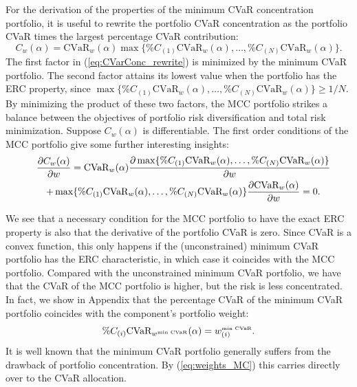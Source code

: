 \documentclass[12pt,a4paper]{article}
\begin{document}
For the derivation of the properties of the minimum CVaR concentration portfolio, it is useful to rewrite the portfolio CVaR concentration as the portfolio CVaR times the largest percentage CVaR contribution:
\begin{equation} C_w(\alpha) = \mbox{CVaR}_w(\alpha) \max \{ \%C_{(1)}\mbox{CVaR}_w(\alpha) , \ldots ,  \%C_{(N)}\mbox{CVaR}_w(\alpha)\}. \label{eq:CVarConc_rewrite}\end{equation}
The first factor in (\ref{eq:CVarConc_rewrite}) is minimized by the minimum CVaR portfolio.  The second factor attains its lowest value when the portfolio has the ERC property, since $\max \{ \%C_{(1)}\mbox{CVaR}_w(\alpha) , \ldots ,  \%C_{(N)}\mbox{CVaR}_w(\alpha)\} \geq 1/N.$  By minimizing the product of these two factors, the MCC portfolio strikes a balance between the objectives of portfolio risk diversification and total risk minimization. Suppose $C_w(\alpha)$ is differentiable. The first order conditions of the MCC portfolio give some further interesting insights:
\begin{eqnarray}
\lefteqn{ \frac{\partial C_w(\alpha)}{\partial w} = \mbox{CVaR}_w(\alpha) \frac{\partial \max\{ \%C_{(1)}\mbox{CVaR}_w(\alpha) , \ldots ,  \%C_{(N)}\mbox{CVaR}_w(\alpha) \}}{\partial w} } && \notag \\
&& +  \max\{ \%C_{(1)}\mbox{CVaR}_w(\alpha) , \ldots ,  \%C_{(N)}\mbox{CVaR}_w(\alpha) \} \frac{\partial \mbox{CVaR}_w(\alpha)}{\partial w} = 0.
\label{eq:FOC_MCC}\end{eqnarray}

We see that a necessary condition for the MCC portfolio to have the exact ERC property is also that the derivative of the portfolio CVaR is zero. Since CVaR is a convex function, this only happens if the (unconstrained) minimum CVaR portfolio has the ERC characteristic, in which case it coincides with the MCC portfolio. Compared with the unconstrained minimum CVaR portfolio, we have that the CVaR of the MCC portfolio is higher, but the risk is less concentrated. In fact, we show in Appendix that the percentage CVaR of the minimum CVaR portfolio coincides with the component's portfolio weight:
\begin{equation} \%C_{(i)} \mbox{CVaR}_{w^{\mbox{\tiny min CVaR}}}(\alpha) = w^{\mbox{\tiny min CVaR}}_{(i)}. \label{eq:weights_MC}\end{equation}
It is well known that the minimum CVaR portfolio generally suffers from the drawback of portfolio concentration. By (\ref{eq:weights_MC}) this carries directly over to the CVaR allocation.
\end{document}
